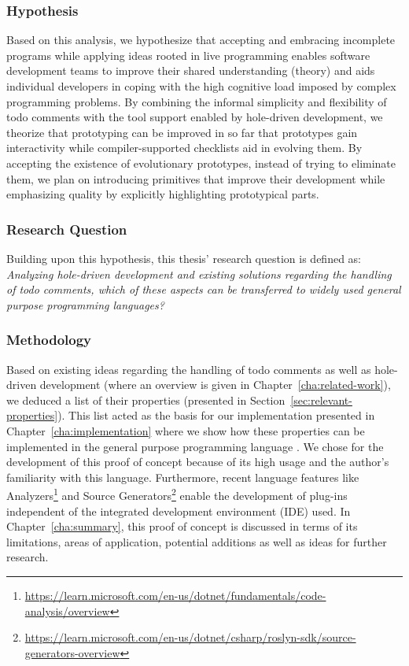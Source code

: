 \subsubsection{Hypothesis}
Based on this analysis, we hypothesize that accepting and embracing incomplete programs while applying ideas rooted in live programming enables software development teams to improve their shared understanding (theory) and aids individual developers in coping with the high cognitive load imposed by complex programming problems.
By combining the informal simplicity and flexibility of todo comments with the tool support enabled by hole-driven development, we theorize that prototyping can be improved in so far that prototypes gain interactivity while compiler-supported checklists aid in evolving them.
By accepting the existence of evolutionary prototypes, instead of trying to eliminate them, we plan on introducing primitives that improve their development while emphasizing quality by explicitly highlighting prototypical parts.

\subsubsection{Research Question}
Building upon this hypothesis, this thesis' research question is defined as: \emph{Analyzing hole-driven development and existing solutions regarding the handling of todo comments, which of these aspects can be transferred to widely used general purpose programming languages?}

\subsubsection{Methodology}
Based on existing ideas regarding the handling of todo comments as well as hole-driven development (where an overview is given in Chapter~\ref{cha:related-work}), we deduced a list of their properties (presented in Section~\ref{sec:relevant-properties}).
This list acted as the basis for our implementation presented in Chapter~\ref{cha:implementation} where we show how these properties can be implemented in the general purpose programming language \CS.
We chose \CS for the development of this proof of concept because of its high usage \cite{stack_overflow_stack_2023, tiobe_software_bv_tiobe_2023} and the author's familiarity with this language.
Furthermore, recent language features like Analyzers\footnote{\url{https://learn.microsoft.com/en-us/dotnet/fundamentals/code-analysis/overview}} and Source Generators\footnote{\url{https://learn.microsoft.com/en-us/dotnet/csharp/roslyn-sdk/source-generators-overview}} enable the development of plug-ins independent of the integrated development environment (IDE) used.
In Chapter~\ref{cha:summary}, this proof of concept is discussed in terms of its limitations, areas of application, potential additions as well as ideas for further research.

